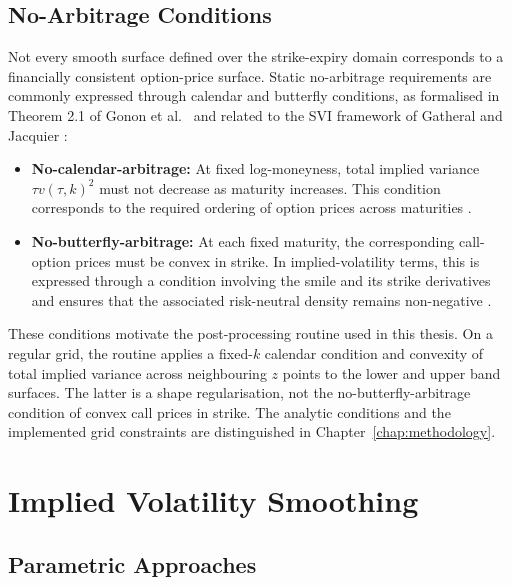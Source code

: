 \subsection{No-Arbitrage Conditions}
\label{subsec:no_arbitrage}

Not every smooth surface defined over the strike-expiry domain corresponds to a financially consistent option-price surface. Static no-arbitrage requirements are commonly expressed through calendar and butterfly conditions, as formalised in Theorem 2.1 of Gonon et al.\ \cite{gonon2024operator} and related to the SVI framework of Gatheral and Jacquier \cite{gatheral2014ssvi}:

\begin{itemize}
    \item \textbf{No-calendar-arbitrage:} At fixed log-moneyness, total implied variance $\tau v(\tau,k)^2$ must not decrease as maturity increases. This condition corresponds to the required ordering of option prices across maturities \cite{gonon2024operator}.

    \item \textbf{No-butterfly-arbitrage:} At each fixed maturity, the corresponding call-option prices must be convex in strike. In implied-volatility terms, this is expressed through a condition involving the smile and its strike derivatives and ensures that the associated risk-neutral density remains non-negative \cite{gonon2024operator}.
\end{itemize}

These conditions motivate the post-processing routine used in this thesis. On a regular grid, the routine applies a fixed-$k$ calendar condition and convexity of total implied variance across neighbouring $z$ points to the lower and upper band surfaces. The latter is a shape regularisation, not the no-butterfly-arbitrage condition of convex call prices in strike. The analytic conditions and the implemented grid constraints are distinguished in Chapter~\ref{chap:methodology}.

\section{Implied Volatility Smoothing}
\label{sec:iv_smoothing}

\subsection{Parametric Approaches}
\label{subsec:parametric}

